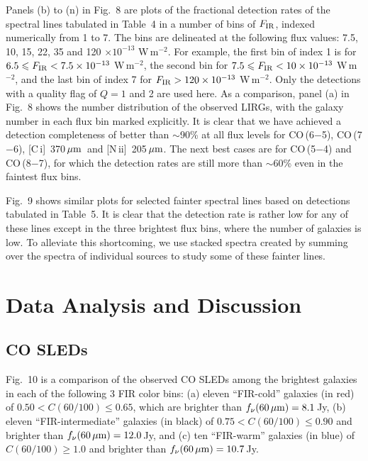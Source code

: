 \documentclass[preprint]{aastex}
\newcommand{\um}{\mbox{$\,\mu{\rm m}$}}
\newcommand{\CI}{[C\,{\sc i}]}
\newcommand{\NII}{\mbox{[N\,{\sc ii}]}}
\begin{document}
Panels (b) to (n) in Fig.~8 are plots of the fractional detection rates of the spectral
lines tabulated in Table~4 in a number of bins of $F_{\rm IR}$, indexed numerically 
from 1 to 7.  The bins are delineated at the following flux values: 7.5, 10, 15, 
22, 35 and 120 $\times 10^{-13}$ W\,m$^{-2}$. For example, the first bin of index 1 
is for $6.5 \leqslant F_{\rm IR} < 7.5 \times 10^{-13}$ W\,m$^{-2}$, 
the second bin for $7.5 \leqslant 
F_{\rm IR} < 10 \times 10^{-13}$ W\,m$^{-2}$, and the last bin of index 7 for 
$F_{\rm IR} > 120 \times 10^{-13}$ W\,m$^{-2}$.   Only the detections with a quality
flag of $Q = 1$ and 2 are used here.  As a comparison, panel (a) in Fig.~8 shows 
the number distribution of the observed LIRGs, with the galaxy number in each flux bin
marked explicitly.  It is clear that we have achieved a detection 
completeness of better than $\sim$90\% at all flux levels for CO\,(6$-$5), CO\,(7$-$6),
\CI\ 370\um\ and \NII\ 205\um.  The next best cases are for CO\,(5$-$4) and CO\,(8$-$7), 
for which the detection rates are still more than $\sim$60\% even in the faintest flux
bins. 


Fig.~9 shows similar plots for selected fainter spectral lines based on detections
tabulated in Table~5.  It is clear that the detection rate is rather low for any of these 
lines except in the three brightest flux bins, where the number of galaxies is low.  
To alleviate this shortcoming, we use stacked spectra created by summing over the 
spectra of individual sources to study some of these fainter lines.









\section{Data Analysis and Discussion} \label{sec5}



\subsection{CO SLEDs} \label{sec5.1}



Fig.~10 is a comparison of the observed CO SLEDs among the brightest galaxies in each 
of the following 3 FIR color bins:  (a) eleven ``FIR-cold'' galaxies (in red) of 
$0.50 < C(60/100) \leqslant 0.65$, which are brighter than $f_{\nu}(60\um) = 8.1\,$Jy,
(b) eleven ``FIR-intermediate'' galaxies (in black) of $0.75 < C(60/100) \leqslant 
0.90$ and brighter than $f_{\nu}(60\um) = 12.0\,$Jy, and (c) ten ``FIR-warm'' galaxies
(in blue) of $C(60/100) \geqslant 1.0$ and brighter than $f_{\nu}(60\um) = 10.7\,$Jy.  
\end{document}
